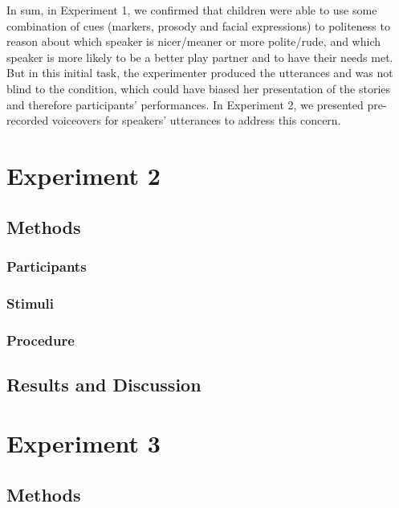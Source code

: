 \documentclass[10pt, letterpaper]{article}
\begin{document}
In sum, in Experiment 1, we confirmed that children were able to use
some combination of cues (markers, prosody and facial expressions) to
politeness to reason about which speaker is nicer/meaner or more
polite/rude, and which speaker is more likely to be a better play
partner and to have their needs met. But in this initial task, the
experimenter produced the utterances and was not blind to the condition,
which could have biased her presentation of the stories and therefore
participants' performances. In Experiment 2, we presented pre-recorded
voiceovers for speakers' utterances to address this concern.

\section{Experiment 2}\label{experiment-2}

\subsection{Methods}\label{methods-1}

\subsubsection{Participants}\label{participants-1}

\subsubsection{Stimuli}\label{stimuli-1}

\subsubsection{Procedure}\label{procedure-1}

\subsection{Results and Discussion}\label{results-and-discussion-1}

\section{Experiment 3}\label{experiment-3}

\subsection{Methods}\label{methods-2}
\end{document}
